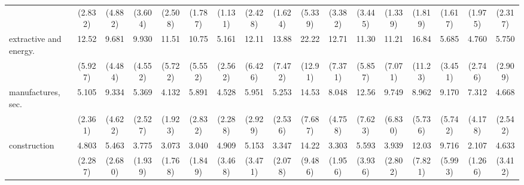 {\begin{tabular}{l*{16}{c}}
                    &     (2.832)         &     (4.882)         &     (3.604)         &     (2.508)         &     (1.787)         &     (1.131)         &     (2.428)         &     (1.624)         &     (5.339)         &     (3.382)         &     (3.445)         &     (1.339)         &     (1.819)         &     (1.617)         &     (1.975)         &     (2.317)         \\
[1em]
extractive and energy.&       12.52\sym{***}&       9.681\sym{***}&       9.930\sym{***}&       11.51\sym{***}&       10.75\sym{***}&       5.161\sym{***}&       12.11\sym{***}&       13.88\sym{***}&       22.22\sym{***}&       12.71\sym{***}&       11.30\sym{***}&       11.21\sym{***}&       16.84\sym{***}&       5.685\sym{**} &       4.760\sym{**} &       5.750\sym{***}\\
                    &     (5.927)         &     (4.484)         &     (4.552)         &     (5.722)         &     (5.552)         &     (2.562)         &     (6.426)         &     (7.472)         &     (12.91)         &     (7.371)         &     (5.857)         &     (7.071)         &     (11.23)         &     (3.451)         &     (2.746)         &     (2.909)         \\
[1em]
manufactures, sec.  &       5.105\sym{***}&       9.334\sym{***}&       5.369\sym{***}&       4.132\sym{**} &       5.891\sym{***}&       4.528\sym{**} &       5.951\sym{***}&       5.253\sym{***}&       14.53\sym{***}&       8.048\sym{***}&       12.56\sym{***}&       9.749\sym{**} &       8.962\sym{***}&       9.170\sym{***}&       7.312\sym{***}&       4.668\sym{**} \\
                    &     (2.361)         &     (4.622)         &     (2.527)         &     (1.923)         &     (2.832)         &     (2.288)         &     (2.929)         &     (2.536)         &     (7.687)         &     (4.758)         &     (7.623)         &     (6.830)         &     (5.736)         &     (5.742)         &     (4.178)         &     (2.542)         \\
[1em]
construction        &       4.803\sym{***}&       5.463\sym{***}&       3.775\sym{**} &       3.073         &       3.040         &       4.909\sym{*}  &       5.153\sym{*}  &       3.347         &       14.22\sym{***}&       3.303\sym{*}  &       5.593\sym{*}  &       3.939         &       12.03\sym{***}&       9.716\sym{***}&       2.107         &       4.633\sym{*}  \\
                    &     (2.287)         &     (2.680)         &     (1.939)         &     (1.768)         &     (1.849)         &     (3.468)         &     (3.471)         &     (2.078)         &     (9.486)         &     (1.956)         &     (3.936)         &     (2.802)         &     (7.821)         &     (5.993)         &     (1.266)         &     (3.412)         \\

\end{tabular}}
